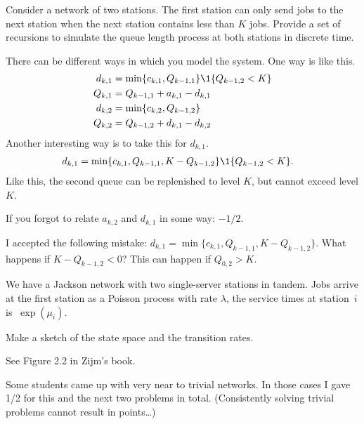 \begin{exercise}[201804]
Consider a network of two stations. The first station can only send jobs to the next station when the next station contains less than $K$ jobs. Provide a set of recursions to simulate the queue length process at  both stations in discrete time. 

\begin{solution}
  There can be different ways in which you model the system. One way is like this.
  \begin{align*}
    d_{k,1} &= \min\{c_{k,1}, Q_{k-1, 1}\}\1{Q_{k-1,2}<K} \\
    Q_{k,1} &= Q_{k-1,1} + a_{k,1} - d_{k,1}\\
    d_{k,2} &= \min\{c_{k,2}, Q_{k-1, 2}\} \\
    Q_{k,2} &= Q_{k-1,2} + d_{k,1} - d_{k,2}\\
  \end{align*}
Another interesting way is to take this for $d_{k,1}$.
  \begin{align*}
    d_{k,1} &= \min\{c_{k,1}, Q_{k-1, 1}, K-Q_{k-1,2}\}\1{Q_{k-1,2}<K}.
  \end{align*}
Like this, the second queue can be replenished to level $K$, but cannot exceed level $K$. 

If you forgot to relate $a_{k,2}$ and $d_{k,1}$ in some way: $-1/2$. 

I accepted the following mistake: 
$d_{k,1} = \min\{c_{k,1}, Q_{k-1, 1}, K-Q_{k-1,2}\}$. What happens if $K-Q_{k-1,2}<0$? This can happen if $Q_{0,2} > K$.

\end{solution}
\end{exercise}

We have a Jackson network with two single-server stations in tandem. Jobs
arrive at the first station as a Poisson process with rate $\lambda$,
the service times at station~$i$ is $~\exp(\mu_i)$.


\begin{exercise}[201804]
Make a sketch of the state space and the transition rates.
\begin{solution}
  See Figure 2.2 in Zijm's book.

Some students came up with very near to trivial networks. In those cases I gave 1/2 for this and the next two problems in total. (Consistently solving trivial problems cannot result in points\ldots)
\end{solution}
\end{exercise}

